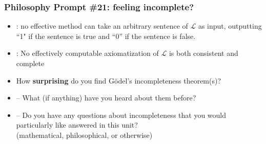 \begin{frame}
\frametitle{Philosophy Prompt \#21: feeling incomplete?}

\begin{itemize}[<+->]

\item {}: no \textcolor{OGlyallpink}{effective method} can take an arbitrary sentence of $\mathcal{L}$ as input, outputting ``1" if the sentence is true and ``0'' if the sentence is false. 

\item {}: No \textcolor{OGlyallpink}{effectively computable} axiomatization of $\mathcal{L}$ is both consistent and complete

\item How \textbf{surprising} do you find G\"odel's incompleteness theorem(s)?

\item[] -- What (if anything) have you heard about them before?

\item[] -- Do you have any questions about incompleteness that you would particularly like answered in this unit? \\ (mathematical, philosophical, or otherwise)

\end{itemize}
\end{frame}

